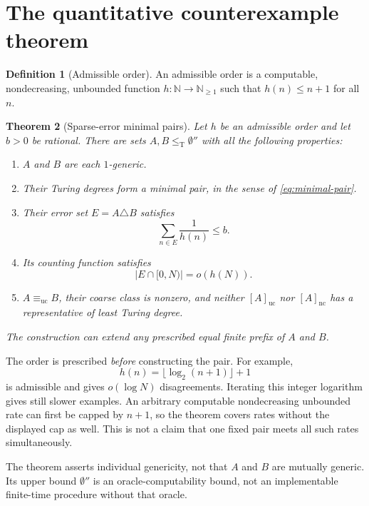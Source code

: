 \documentclass[11pt,a4paper]{article}
\newcommand{\N}{\mathbb N}
\newcommand{\leT}{\leq_{\mathrm T}}
\newcommand{\nc}{\mathrm{nc}}
\newcommand{\uc}{\mathrm{uc}}
\newtheorem{theorem}{Theorem}[section]
\theoremstyle{definition}
\newtheorem{definition}[theorem]{Definition}
\theoremstyle{remark}
\begin{document}
\section{The quantitative counterexample theorem}\label{sec:main}
\begin{definition}[Admissible order]
An admissible order is a computable, nondecreasing, unbounded function $h:\N\to\N_{\geq1}$ such that $h(n)\leq n+1$ for all $n$.
\end{definition}

\begin{theorem}[Sparse-error minimal pairs]\label{thm:main}
Let $h$ be an admissible order and let $b>0$ be rational. There are sets $A,B\leT\emptyset''$ with all the following properties:
\begin{enumerate}[label=(\roman*)]
\item $A$ and $B$ are each $1$-generic.
\item Their Turing degrees form a minimal pair, in the sense of \eqref{eq:minimal-pair}.
\item Their error set $E=A\triangle B$ satisfies
\begin{equation}\label{eq:weighted-bound}
\sum_{n\in E}\frac1{h(n)}\leq b.
\end{equation}
\item Its counting function satisfies
\begin{equation}\label{eq:little-o}
|E\cap[0,N)|=o(h(N)).
\end{equation}
\item $A\equiv_{\uc}B$, their coarse class is nonzero, and neither $[A]_{\uc}$ nor $[A]_{\nc}$ has a representative of least Turing degree.
\end{enumerate}
The construction can extend any prescribed equal finite prefix of $A$ and $B$.
\end{theorem}

The order is prescribed \emph{before} constructing the pair. For example,
\[
h(n)=\lfloor\log_2(n+1)\rfloor+1
\]
is admissible and gives $o(\log N)$ disagreements. Iterating this integer logarithm gives still slower examples. An arbitrary computable nondecreasing unbounded rate can first be capped by $n+1$, so the theorem covers rates without the displayed cap as well. This is not a claim that one fixed pair meets all such rates simultaneously.

The theorem asserts individual genericity, not that $A$ and $B$ are mutually generic. Its upper bound $\emptyset''$ is an oracle-computability bound, not an implementable finite-time procedure without that oracle.
\end{document}
